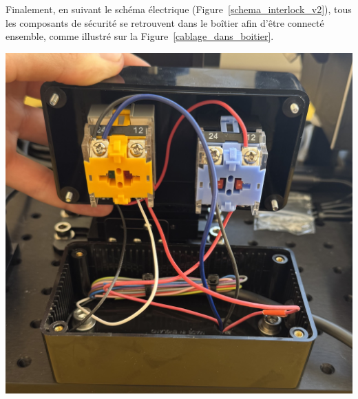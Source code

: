 \begin{minipage}[c]{0.48\textwidth}
    Finalement, en suivant le schéma électrique (Figure~\ref{schema_interlock_v2}), tous les composants de sécurité se retrouvent dans le boîtier afin d'être connecté ensemble, comme illustré sur la Figure~\ref{cablage_dans_boitier}.
\end{minipage}\hfill
\begin{minipage}[c]{0.48\textwidth}
    \begin{center}
        \includegraphics[width=\textwidth]{assets/figures/Protections_laser/Securite_electrique/cablage_dans_boitier.jpeg}
    \end{center}
    \label{cablage_dans_boitier}
\end{minipage}